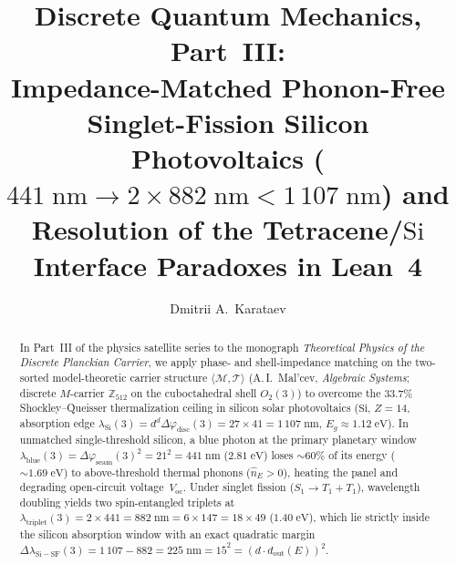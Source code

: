 \documentclass[11pt,a4paper]{article}
\title{\textbf{Discrete Quantum Mechanics, Part~III:\\ Impedance-Matched Phonon-Free Singlet-Fission Silicon Photovoltaics ($441\;\text{nm}\to 2\times 882\;\text{nm} < 1\,107\;\text{nm}$) and Resolution of the Tetracene/$\mathrm{Si}$ Interface Paradoxes in Lean~4}}
\author{Dmitrii A.~Karataev}
\date{}
\theoremstyle{plain}
\theoremstyle{definition}
\begin{document}
\maketitle

\begin{abstract}
In Part~III of the physics satellite series to the monograph \emph{Theoretical Physics of the Discrete Planckian Carrier}, we apply phase- and shell-impedance matching on the two-sorted model-theoretic carrier structure $\langle\mathcal{M},\mathcal{T}\rangle$ (A.\,I.~Mal'cev, \emph{Algebraic Systems}; discrete $M$-carrier $\mathbb{Z}_{512}$ on the cuboctahedral shell $O_2(3)$) to overcome the $33.7\%$ Shockley--Queisser thermalization ceiling in silicon solar photovoltaics ($\mathrm{Si}$, $Z=14$, absorption edge $\lambda_{\mathrm{Si}}(3) = d^d\Delta\varphi_{\mathrm{disc}}(3) = 27\times 41 = 1\,107\;\text{nm}$, $E_g\approx 1.12\;\text{eV}$). In unmatched single-threshold silicon, a blue photon at the primary planetary window $\lambda_{\mathrm{blue}}(3) = \Delta\varphi_{\mathrm{seam}}(3)^2 = 21^2 = 441\;\text{nm}$ ($2.81\;\text{eV}$) loses $\sim 60\%$ of its energy ($\sim 1.69\;\text{eV}$) to above-threshold thermal phonons ($\hat{n}_E > 0$), heating the panel and degrading open-circuit voltage~$V_{\mathrm{oc}}$. Under singlet fission ($S_1\to T_1 + T_1$), wavelength doubling yields two spin-entangled triplets at $\lambda_{\mathrm{triplet}}(3) = 2\times 441 = 882\;\text{nm} = 6\times 147 = 18\times 49$ ($1.40\;\text{eV}$), which lie strictly inside the silicon absorption window with an exact quadratic margin $\Delta\lambda_{\mathrm{Si-SF}}(3) = 1\,107 - 882 = 225\;\text{nm} = 15^2 = (d\cdot d_{\mathrm{out}}(E))^2$.


\end{abstract}
\end{document}

